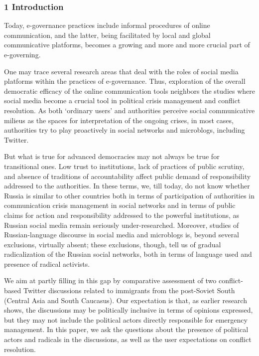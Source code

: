 \subsubsection{1 Introduction}

Today, e-governance practices include informal procedures of online communication, and the latter, being facilitated by local and global communicative platforms, becomes a growing and more and more crucial part of e-governing.

One may trace several research areas that deal with the roles of social media platforms within the practices of e-governance. Thus, exploration of the overall democratic efficacy of the online communication tools neighbors the studies where social media become a crucial tool in political crisis management and conflict resolution. As both ‘ordinary users’ and authorities perceive social communicative milieus as the spaces for interpretation of the ongoing crises, in most cases, authorities try to play proactively in social networks and microblogs, including Twitter.

But what is true for advanced democracies may not always be true for transitional ones. Low trust to institutions, lack of practices of public scrutiny, and absence of traditions of accountability affect public demand of responsibility addressed to the authorities. In these terms, we, till today, do not know whether Russia is similar to other countries both in terms of participation of authorities in communication crisis management in social networks and in terms of public claims for action and responsibility addressed to the powerful institutions, as Russian social media remain seriously under-researched. Moreover, studies of Russian-language discourse in social media and microblogs is, beyond several exclusions, virtually absent; these exclusions, though, tell us of gradual radicalization of the Russian social networks, both in terms of language used and presence of radical activists.

We aim at partly filling in this gap by comparative assessment of two conflict-based Twitter discussions related to immigrants from the post-Soviet South (Central Asia and South Caucasus). Our expectation is that, as earlier research shows, the discussions may be politically inclusive in terms of opinions expressed, but they may not include the political actors directly responsible for emergency management. In this paper, we ask the questions about the presence of political actors and radicals in the discussions, as well as the user expectations on conflict resolution.

